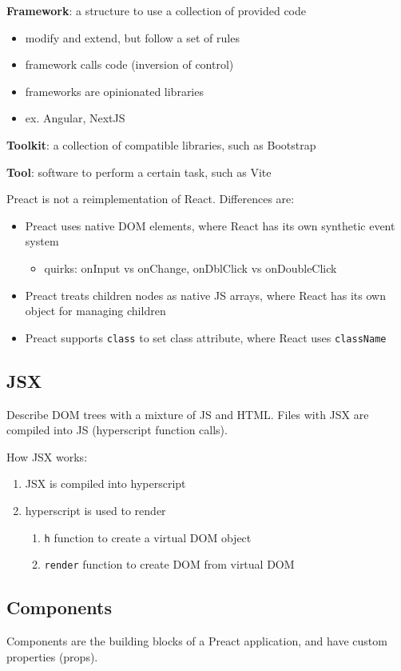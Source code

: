 \documentclass[11pt]{article}
\begin{document}
\textbf{Framework}: a structure to use a collection of provided code
\begin{itemize}
\item modify and extend, but follow a set of rules
\item framework calls code (inversion of control)
\item frameworks are opinionated libraries
\item ex. Angular, NextJS
\end{itemize}

\textbf{Toolkit}: a collection of compatible libraries, such as Bootstrap

\textbf{Tool}: software to perform a certain task, such as Vite

Preact is not a reimplementation of React.
Differences are:
\begin{itemize}
\item Preact uses native DOM elements, where React has its own synthetic event system
\begin{itemize}
\item quirks: onInput vs onChange, onDblClick vs onDoubleClick
\end{itemize}
\item Preact treats children nodes as native JS arrays, where React has its own object for managing
children
\item Preact supports \texttt{class} to set class attribute, where React uses \texttt{className}
\end{itemize}
\subsection{JSX}
\label{sec:org52f0ed2}
Describe DOM trees with a mixture of JS and HTML.
Files with JSX are compiled into JS (hyperscript function calls).

How JSX works:
\begin{enumerate}
\item JSX is compiled into hyperscript
\item hyperscript is used to render
\begin{enumerate}
\item \texttt{h} function to create a virtual DOM object
\item \texttt{render} function to create DOM from virtual DOM
\end{enumerate}
\end{enumerate}
\subsection{Components}
\label{sec:org8d9dd63}
Components are the building blocks of a Preact application, and have custom properties (props).
\end{document}
